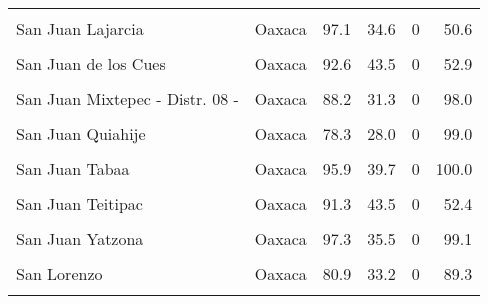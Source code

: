 \documentclass[
]{report}
\begin{document}
\begin{longtable}[t]{llrrrr}
\cellcolor{gray!6}{San Juan Lachao} & \cellcolor{gray!6}{Oaxaca} & \cellcolor{gray!6}{82.9} & \cellcolor{gray!6}{37.3} & \cellcolor{gray!6}{0} & \cellcolor{gray!6}{79.0}\\
San Juan Lajarcia & Oaxaca & 97.1 & 34.6 & 0 & 50.6\\
\cellcolor{gray!6}{San Juan Lalana} & \cellcolor{gray!6}{Oaxaca} & \cellcolor{gray!6}{76.0} & \cellcolor{gray!6}{33.7} & \cellcolor{gray!6}{0} & \cellcolor{gray!6}{87.8}\\
San Juan de los Cues & Oaxaca & 92.6 & 43.5 & 0 & 52.9\\
\cellcolor{gray!6}{San Juan Mazatlan} & \cellcolor{gray!6}{Oaxaca} & \cellcolor{gray!6}{89.6} & \cellcolor{gray!6}{36.6} & \cellcolor{gray!6}{0} & \cellcolor{gray!6}{78.9}\\
\addlinespace
San Juan Mixtepec - Distr. 08 - & Oaxaca & 88.2 & 31.3 & 0 & 98.0\\
\cellcolor{gray!6}{San Juan Ozolotepec} & \cellcolor{gray!6}{Oaxaca} & \cellcolor{gray!6}{80.5} & \cellcolor{gray!6}{37.3} & \cellcolor{gray!6}{0} & \cellcolor{gray!6}{80.0}\\
San Juan Quiahije & Oaxaca & 78.3 & 28.0 & 0 & 99.0\\
\cellcolor{gray!6}{San Juan Quiotepec} & \cellcolor{gray!6}{Oaxaca} & \cellcolor{gray!6}{85.2} & \cellcolor{gray!6}{28.3} & \cellcolor{gray!6}{0} & \cellcolor{gray!6}{98.1}\\
San Juan Tabaa & Oaxaca & 95.9 & 39.7 & 0 & 100.0\\
\addlinespace
\cellcolor{gray!6}{San Juan Teita} & \cellcolor{gray!6}{Oaxaca} & \cellcolor{gray!6}{90.5} & \cellcolor{gray!6}{37.3} & \cellcolor{gray!6}{0} & \cellcolor{gray!6}{98.5}\\
San Juan Teitipac & Oaxaca & 91.3 & 43.5 & 0 & 52.4\\
\cellcolor{gray!6}{San Juan Tepeuxila} & \cellcolor{gray!6}{Oaxaca} & \cellcolor{gray!6}{92.0} & \cellcolor{gray!6}{39.5} & \cellcolor{gray!6}{0} & \cellcolor{gray!6}{90.2}\\
San Juan Yatzona & Oaxaca & 97.3 & 35.5 & 0 & 99.1\\
\cellcolor{gray!6}{San Juan Yucuita} & \cellcolor{gray!6}{Oaxaca} & \cellcolor{gray!6}{97.7} & \cellcolor{gray!6}{36.5} & \cellcolor{gray!6}{0} & \cellcolor{gray!6}{50.6}\\
\addlinespace
San Lorenzo & Oaxaca & 80.9 & 33.2 & 0 & 89.3\\
\cellcolor{gray!6}{San Lorenzo Albarradas} & \cellcolor{gray!6}{Oaxaca} & \cellcolor{gray!6}{93.8} & \cellcolor{gray!6}{37.9} & \cellcolor{gray!6}{0} & \cellcolor{gray!6}{74.2}\\

\end{longtable}
\end{document}
